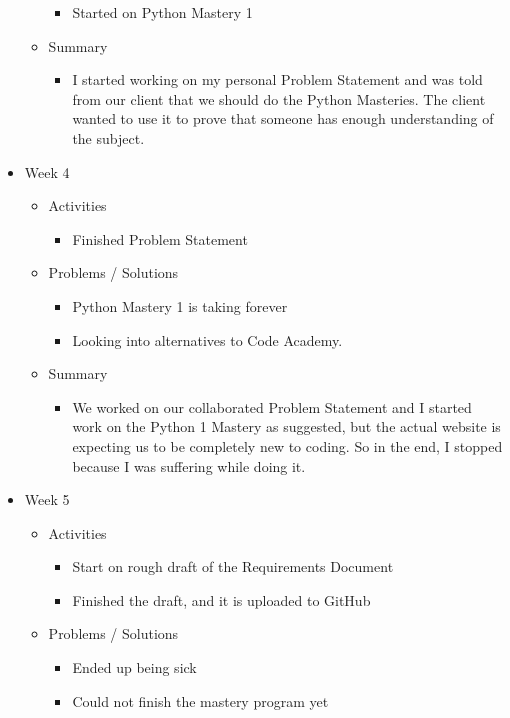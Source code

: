 \begin{itemize}
\begin{itemize}
\begin{itemize}
\item Started on Python Mastery 1
\end{itemize}
\item Summary
\begin{itemize}
\item I started working on my personal Problem Statement and was told from our client that we should do the Python Masteries. The client wanted to use it to prove that someone has enough understanding of the subject.
\end{itemize}
\end{itemize}
\item Week 4
\begin{itemize}
\item Activities
\begin{itemize}
\item Finished Problem Statement
\end{itemize}
\item Problems / Solutions
\begin{itemize}
\item Python Mastery 1 is taking forever
\item Looking into alternatives to Code Academy.
\end{itemize}
\item Summary
\begin{itemize}
\item We worked on our collaborated Problem Statement and I started work on the Python 1 Mastery as suggested, but the actual website is expecting us to be completely new to coding. So in the end, I stopped because I was suffering while doing it. 
\end{itemize}
\end{itemize}
\item Week 5
\begin{itemize}
\item Activities
\begin{itemize}
\item Start on rough draft of the Requirements Document
\item Finished the draft, and it is uploaded to GitHub
\end{itemize}
\item Problems / Solutions
\begin{itemize}
\item Ended up being sick
\item Could not finish the mastery program yet
\end{itemize}

\end{itemize}
\end{itemize}
